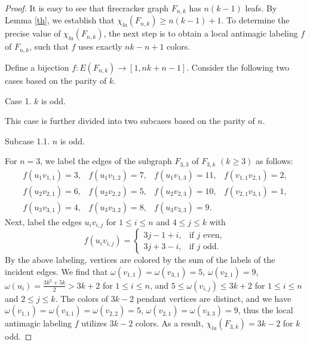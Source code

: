 \documentclass[12pt]{article}
\begin{document}
\begin{proof}
It is easy to see that firecracker graph $F_{n,k}$ has $n(k-1)$ leafs. By Lemma \ref{th}, we establish that $\chi_{la}(F_{n,k})\geq n(k-1)+1$. To determine the precise value of $\chi_{la}(F_{n,k})$, the next step is to obtain a local antimagic labeling $f$ of $F_{n,k}$,
such that $f$ uses exactly $nk-n+1$ colors.%

Define a bijection $f:E(F_{n,k})\rightarrow [1,nk+n-1]$. Consider the following two cases based on the parity of $k$.

Case 1. $k$ is odd.

This case is further divided into two subcases based on the parity of $n$.

Subcase 1.1. $n$ is odd.

For $n=3$, we label the edges of the subgraph $F_{3,3}$ of $F_{3,k}$ $(k\geq 3)$ as follows:
\begin{equation*}
\begin{array}{llll}
f(u_{1}v_{1,1})=3, &f(u_{1}v_{1,2})=7,
&f(u_{1}v_{1,3})=11, &f(v_{1,1}v_{2,1})=2,\\[3pt]
f(u_{2}v_{2,1})=6, &f(u_{2}v_{2,2})=5,
&f(u_{2}v_{2,3})=10,&f(v_{2,1}v_{3,1})=1,\\[3pt]
f(u_{3}v_{3,1})=4, &f(u_{3}v_{3,2})=8,&f(u_{3}v_{3,3})=9.
\end{array}
\end{equation*}
Next, label the edges $u_{i}v_{i,j}$ for $1\leq i\leq n$ and $4\leq j\leq k$ with
\begin{equation*}
f(u_{i}v_{i,j})=\left\{\begin{array}{ll}
3j-1+i,   &\text{if $j$ even},\\[3pt]
3j+3-i, &\text{if $j$ odd}.
\end{array}\right.
\end{equation*}
By the above labeling, vertices are colored by the sum of the labels of the incident edges. We find that $\omega(v_{1,1})=\omega(v_{3,1})=5$, $\omega(v_{2,1})=9$, $\omega(u_{i})=\frac{3k^{2}+5k}{2}>3k+2$ for $1\leq i\leq n$, and $5\leq\omega(v_{i,j})\leq 3k+2$ for $1\leq i\leq n$ and $2\leq j\leq k$.
The colors of $3k-2$ pendant vertices are distinct, and we have $\omega(v_{1,1})=\omega(v_{3,1})=\omega(v_{2,2})=5$,
$\omega(v_{2,1})=\omega(v_{3,3})=9$,
thus the local antimagic labeling $f$ utilizes $3k-2$ colors.
As a result, $\chi_{la}(F_{3,k})=3k-2$ for $k$ odd.



\end{proof}
\end{document}
